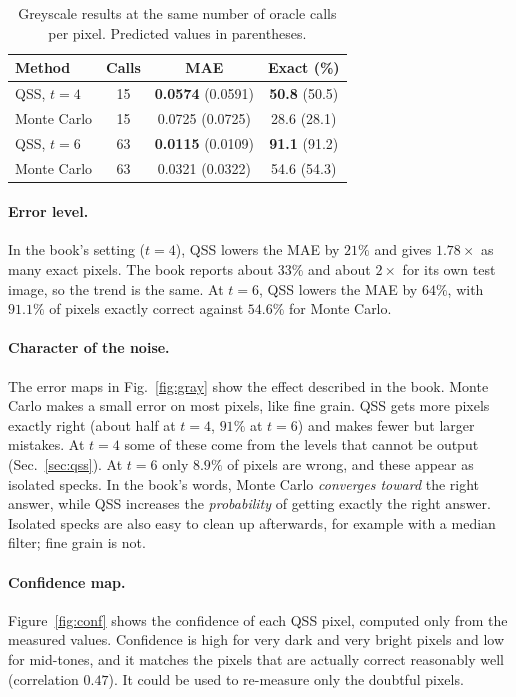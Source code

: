 \documentclass[10pt,twocolumn,a4paper]{article}
\begin{document}
\begin{table}[t]
\centering\small
\setlength{\tabcolsep}{4pt}
\caption{Greyscale results at the same number of oracle calls per pixel.
Predicted values in parentheses.}
\label{tab:gray}
\begin{tabular}{lccc}
\toprule
Method & Calls & MAE & Exact (\%)\\
\midrule
QSS, $t=4$ & 15 & \textbf{0.0574} (0.0591) & \textbf{50.8} (50.5)\\
Monte Carlo & 15 & 0.0725 (0.0725) & 28.6 (28.1)\\
\midrule
QSS, $t=6$ & 63 & \textbf{0.0115} (0.0109) & \textbf{91.1} (91.2)\\
Monte Carlo & 63 & 0.0321 (0.0322) & 54.6 (54.3)\\
\bottomrule
\end{tabular}
\end{table}

\paragraph{Error level.}
In the book's setting ($t=4$), QSS lowers the MAE by $21\%$ and gives
$1.78\times$ as many exact pixels. The book reports about $33\%$ and about
$2\times$ for its own test image, so the trend is the same. At $t=6$, QSS lowers
the MAE by $64\%$, with $91.1\%$ of pixels exactly correct against $54.6\%$
for Monte Carlo.

\paragraph{Character of the noise.}
The error maps in Fig.~\ref{fig:gray} show the effect described in the book.
Monte Carlo makes a small error on most pixels, like fine grain.
QSS gets more pixels exactly right (about half at $t=4$, $91\%$ at $t=6$) and
makes fewer but larger mistakes. At
$t=4$ some of these come from the levels that cannot be output (Sec.~\ref{sec:qss}).
At $t=6$ only $8.9\%$ of pixels are wrong, and these appear as isolated specks.
In the book's words, Monte Carlo \emph{converges toward} the right answer,
while QSS increases the \emph{probability} of getting exactly the right answer.
Isolated specks are also easy to clean up afterwards, for example with a median
filter; fine grain is not.

\paragraph{Confidence map.}
Figure~\ref{fig:conf} shows the confidence of each QSS pixel, computed only
from the measured values. Confidence is high for very dark and very bright
pixels and low for mid-tones, and it matches the pixels that are actually
correct reasonably well (correlation $0.47$). It could be used to re-measure
only the doubtful pixels.
\end{document}
